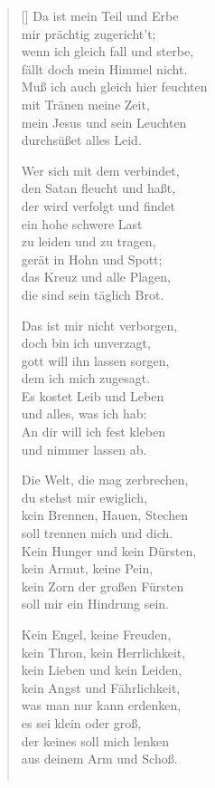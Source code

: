 \begin{multicols}{2}
\begin{verse}[\versewidth]
 Da ist mein Teil und Erbe\\
mir prächtig zugericht't;\\
wenn ich gleich fall und sterbe,\\
fällt doch mein Himmel nicht.\\
Muß ich auch gleich hier feuchten\\
mit Tränen meine Zeit,\\
mein Jesus und sein Leuchten\\
durchsüßet alles Leid.

 Wer sich mit dem verbindet,\\
den Satan fleucht und haßt,\\
der wird verfolgt und findet\\
ein hohe schwere Last\\
zu leiden und zu tragen,\\
gerät in Hohn und Spott;\\
das Kreuz und alle Plagen,\\
die sind sein täglich Brot.

 Das ist mir nicht verborgen,\\
doch bin ich unverzagt,\\
gott will ihn lassen sorgen,\\
dem ich mich zugesagt.\\
Es kostet Leib und Leben\\
und alles, was ich hab:\\
An dir will ich fest kleben\\
und nimmer lassen ab.

 Die Welt, die mag zerbrechen,\\
du stehst mir ewiglich,\\
kein Brennen, Hauen, Stechen\\
soll trennen mich und dich.\\
Kein Hunger und kein Dürsten,\\
kein Armut, keine Pein,\\
kein Zorn der großen Fürsten\\
soll mir ein Hindrung sein.

 Kein Engel, keine Freuden,\\
kein Thron, kein Herrlichkeit,\\
kein Lieben und kein Leiden,\\
kein Angst und Fährlichkeit,\\
was man nur kann erdenken,\\
es sei klein oder groß,\\
der keines soll mich lenken\\
aus deinem Arm und Schoß.

\begin{verbatim}

\end{verbatim}

\end{verse}
\end{multicols}

